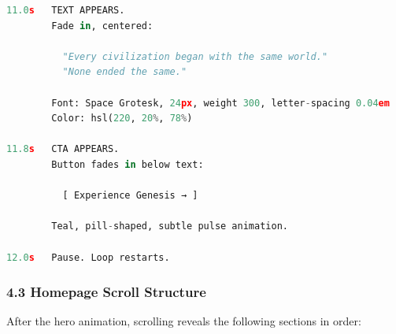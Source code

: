 \documentclass[11pt,a4paper]{article}
\begin{document}
\begin{lstlisting}[language=Python]
11.0s   TEXT APPEARS.
        Fade in, centered:

          "Every civilization began with the same world."
          "None ended the same."

        Font: Space Grotesk, 24px, weight 300, letter-spacing 0.04em
        Color: hsl(220, 20%, 78%)

11.8s   CTA APPEARS.
        Button fades in below text:

          [ Experience Genesis → ]

        Teal, pill-shaped, subtle pulse animation.

12.0s   Pause. Loop restarts.
\end{lstlisting}

\subsubsection*{4.3 Homepage Scroll Structure}

After the hero animation, scrolling reveals the following sections in order:
\end{document}
